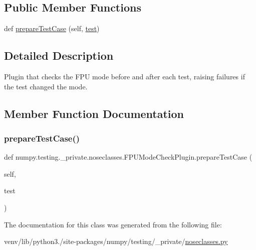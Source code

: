 \subsection*{Public Member Functions}
\begin{DoxyCompactItemize}
\item 
def \hyperlink{classnumpy_1_1testing_1_1__private_1_1noseclasses_1_1FPUModeCheckPlugin_a1cfc6f23a8e195503144a1ce914b1e77}{prepare\+Test\+Case} (self, \hyperlink{namespacenumpy_1_1testing_a6e95cdd7f4d6021fbb8519b9f868c27b}{test})
\end{DoxyCompactItemize}


\subsection{Detailed Description}
\begin{DoxyVerb}Plugin that checks the FPU mode before and after each test,
raising failures if the test changed the mode.
\end{DoxyVerb}
 

\subsection{Member Function Documentation}
\mbox{\label{classnumpy_1_1testing_1_1__private_1_1noseclasses_1_1FPUModeCheckPlugin_a1cfc6f23a8e195503144a1ce914b1e77}} 
\subsubsection{\texorpdfstring{prepare\+Test\+Case()}{prepareTestCase()}}
{\footnotesize\ttfamily def numpy.\+testing.\+\_\+private.\+noseclasses.\+F\+P\+U\+Mode\+Check\+Plugin.\+prepare\+Test\+Case (\begin{DoxyParamCaption}\item[{}]{self,  }\item[{}]{test }\end{DoxyParamCaption})}



The documentation for this class was generated from the following file\+:\begin{DoxyCompactItemize}
\item 
venv/lib/python3./site-\/packages/numpy/testing/\+\_\+private/\hyperlink{noseclasses_8py}{noseclasses.\+py}\end{DoxyCompactItemize}
